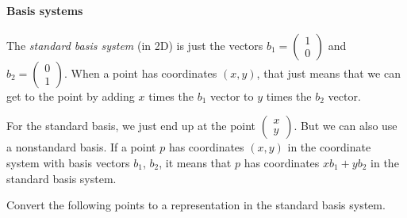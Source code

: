 \documentclass[11pt]{article}
\begin{document}
\paragraph{Basis systems} The \emph{standard basis system} (in 2D) is just the vectors $b_1 =\begin{pmatrix}1 \\0\end{pmatrix}$ and $b_2 = \begin{pmatrix}0 \\1\end{pmatrix}$. When a point has coordinates $(x, y)$, that just means that we can get to the point by adding $x$ times the $b_1$ vector to $y$ times the $b_2$ vector.

For the standard basis, we just end up at the point $\begin{pmatrix}x \\y\end{pmatrix}$. But we can also use a nonstandard basis. If a point $p$ has coordinates $(x, y)$ in the coordinate system with basis vectors $b_1$, $b_2$, it means that $p$ has coordinates $xb_1 + yb_2$ in the standard basis system. 

\qu Convert the following points to a representation in the standard basis system.
\end{document}
